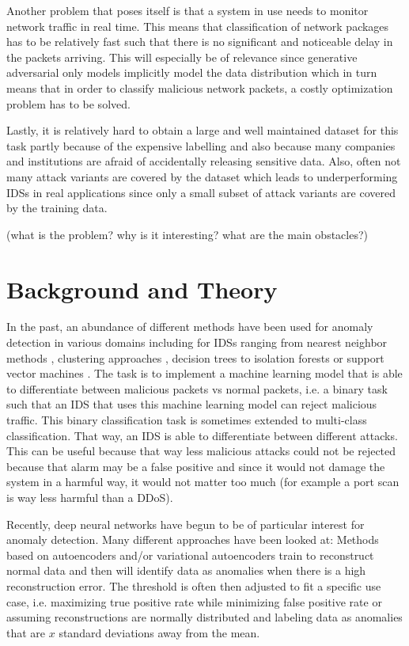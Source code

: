 \documentclass[]{article}
\begin{document}
	\noindent
	Another problem that poses itself is that a system in use needs to monitor network traffic in real time. This means that classification of network packages has to be relatively fast such that there is no significant and noticeable delay in the packets arriving. This will especially be of relevance since generative adversarial only models implicitly model the data distribution which in turn means that in order to classify malicious network packets, a costly optimization problem has to be solved.
	\newline
	
	\noindent
	Lastly, it is relatively hard to obtain a large and well maintained dataset for this task partly because of the expensive labelling and also because many companies and institutions are afraid of accidentally releasing sensitive data. Also, often not many attack variants are covered by the dataset which leads to underperforming IDSs in real applications since only a small subset of attack variants are covered by the training data. 
	
	(what is the problem? why is it interesting? what are the main obstacles?)
	
	\section{Background and Theory}

	
	 In the past, an abundance of different methods have been used for anomaly detection in various domains including for IDSs ranging from nearest neighbor methods \cite{5377998}, clustering approaches \cite{4244796}, decision trees \cite{6511281} to isolation forests \cite{DING201312} or support vector machines \cite{1234567}. The task is to implement a machine learning model that is able to differentiate between malicious packets vs normal packets, i.e. a binary task such that an IDS that uses this machine learning model can reject malicious traffic. This binary classification task is sometimes extended to multi-class classification. That way, an IDS is able to differentiate between different attacks. This can be useful because that way less malicious attacks could not be rejected because that alarm may be a false positive and since it would not damage the system in a harmful way, it would not matter too much (for example a port scan is way less harmful than a DDoS).
	 
	 Recently, deep neural networks have begun to be of particular interest for anomaly detection. Many different approaches have been looked at: Methods based on autoencoders and/or variational autoencoders train to reconstruct normal data and then will identify data as anomalies when there is a high reconstruction error. The threshold is often then adjusted to fit a specific use case, i.e. maximizing true positive rate while minimizing false positive rate or assuming reconstructions are normally distributed and labeling data as anomalies that are $x$ standard deviations away from the mean. 
	 
\end{document}
